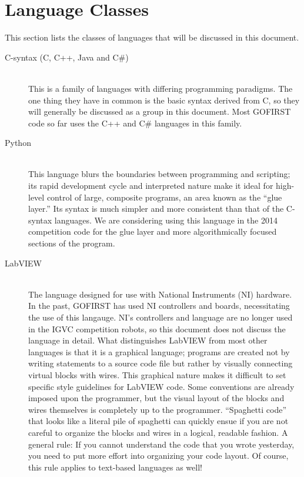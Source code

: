 \documentclass[12pt]{article}
\begin{document}
\section{Language Classes}
This section lists the classes of languages that will be discussed in this document.
\begin{description}
    \item[C-syntax (C, C++, Java and C\#)] \hfill \\
        This is a family of languages with differing programming paradigms. The one thing they have in common is the basic syntax derived from C, so they will generally be discussed as a group in this document. Most GOFIRST code so far uses the C++ and C\# languages in this family.
    \item[Python] \hfill \\
        This language blurs the boundaries between programming and scripting; its rapid development cycle and interpreted nature make it ideal for high-level control of large, composite programs, an area known as the ``glue layer.'' Its syntax is much simpler and more consistent than that of the C-syntax languages. We are considering using this language in the 2014 competition code for the glue layer and more algorithmically focused sections of the program.
    \item[LabVIEW] \hfill \\
        The language designed for use with National Instruments (NI) hardware. In the past, GOFIRST has used NI controllers and boards, necessitating the use of this langauge. NI's controllers and language are no longer used in the IGVC competition robots, so this document does not discuss the language in detail. What distinguishes LabVIEW from most other languages is that it is a graphical language; programs are created not by writing statements to a source code file but rather by visually connecting virtual blocks with wires. This graphical nature makes it difficult to set specific style guidelines for LabVIEW code. Some conventions are already imposed upon the programmer, but the visual layout of the blocks and wires themselves is completely up to the programmer. ``Spaghetti code'' that looks like a literal pile of spaghetti can quickly ensue if you are not careful to organize the blocks and wires in a logical, readable fashion. A general rule: If you cannot understand the code that you wrote yesterday, you need to put more effort into organizing your code layout. Of course, this rule applies to text-based languages as well!
\end{description}
\end{document}
